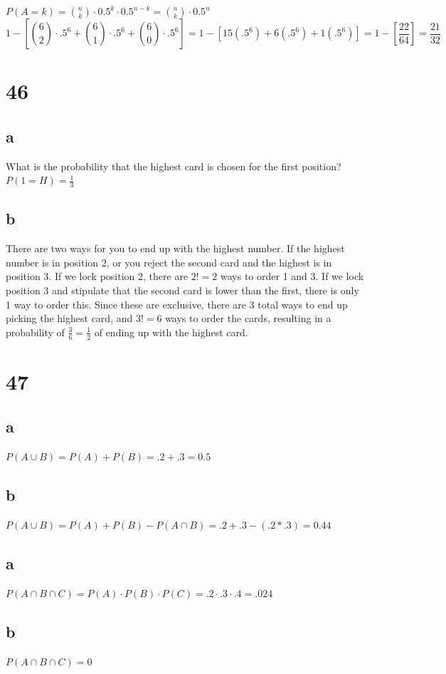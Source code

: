 \documentclass[12pt]{article}
\begin{document}
  $P(A=k) = \binom{n}{k} \cdot 0.5^{k} \cdot 0.5^{n-k} = \binom{n}{k} \cdot 0.5^{n}$ \\
  $$1 - [\binom{6}{2} \cdot .5^6 + \binom{6}{1} \cdot .5^6 + \binom{6}{0} \cdot .5^6] = 1 - [15(.5^6) + 6(.5^6) + 1(.5^6)] = 1 - [\frac{22}{64}] = \frac{21}{32} $$

  \section*{46}
  \subsection*{a}
  What is the probability that the highest card is chosen for the first position? \\
  $P(1 = H) = \frac{1}{3}$
  \subsection*{b}
  There are two ways for you to end up with the highest number. If the highest number is in position 2, or you reject the second card and the highest is in position 3. If we lock position 2, there are $2! = 2$ ways to order 1 and 3. If we lock position 3 and stipulate that the second card is lower than the first, there is only 1 way to order this. Since these are exclusive, there are 3 total ways to end up picking the highest card, and $3! = 6$ ways to order the cards, resulting in a probability of $\frac{3}{6} = \frac{1}{2}$ of ending up with the highest card.

  \section*{47}
  \subsection*{a}
    $P(A \cup B) = P(A) + P(B) = .2 + .3 = 0.5$
  \subsection*{b}
    $P(A \cup B) = P(A) + P(B) - P(A \cap B) = .2 + .3 - (.2 * .3) = 0.44$
  \subsection*{a}
    $P(A \cap B \cap C) = P(A) \cdot P(B) \cdot P(C) = .2 \cdot .3 \cdot .4 = .024$
  \subsection*{b}
    $P(A \cap B \cap C) = 0$
\end{document}
